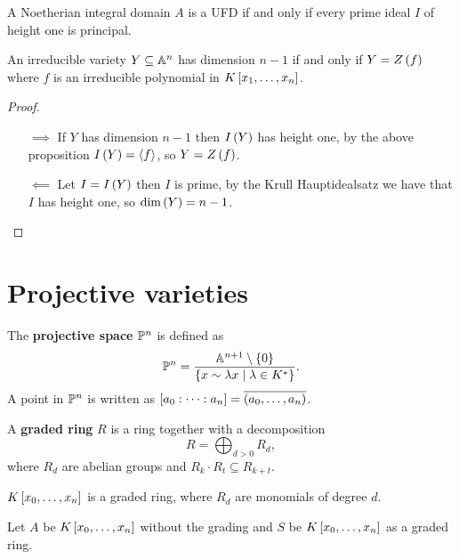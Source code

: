 
\begin{proposition}
A Noetherian integral domain $ A $ is a UFD if and only if every prime ideal $ I $ of height one is principal.
\end{proposition}

\begin{theorem}
An irreducible variety $ Y \subseteq \A^n $ has dimension $ n - 1 $ if and only if $ Y = Z\rb{f} $ where $ f $ is an irreducible polynomial in $ K\sb{x_1, \dots, x_n} $.
\end{theorem}

\begin{proof}
\hfill
\begin{itemize}
\item[$ \implies $] If $ Y $ has dimension $ n - 1 $ then $ I\rb{Y} $ has height one, by the above proposition $ I\rb{Y} = \ab{f} $, so $ Y = Z\rb{f} $.
\item[$ \impliedby $] Let $ I = I\rb{Y} $ then $ I $ is prime, by the Krull Hauptidealsatz we have that $ I $ has height one, so $ \dim\rb{Y} = n - 1 $.
\end{itemize}
\end{proof}

\pagebreak

\section{Projective varieties}

\begin{definition}
The \textbf{projective space} $ \P^n $ is defined as
$$ \P^n = \dfrac{\A^{n + 1} \setminus \cb{0}}{\cb{x \sim \lambda x \mid \lambda \in K^*}}. $$
A point in $ \P^n $ is written as $ \sb{a_0 : \dots : a_n} = \overline{\rb{a_0, \dots, a_n}} $.
\end{definition}

\begin{definition}
A \textbf{graded ring} $ R $ is a ring together with a decomposition
$$ R = \bigoplus_{d > 0} R_d, $$
where $ R_d $ are abelian groups and $ R_k \cdot R_t \subseteq R_{k + t} $.
\end{definition}

\begin{example}
$ K\sb{x_0, \dots, x_n} $ is a graded ring, where $ R_d $ are monomials of degree $ d $.
\end{example}

\begin{notation}
Let $ A $ be $ K\sb{x_0, \dots, x_n} $ without the grading and $ S $ be $ K\sb{x_0, \dots, x_n} $ as a graded ring.
\end{notation}

